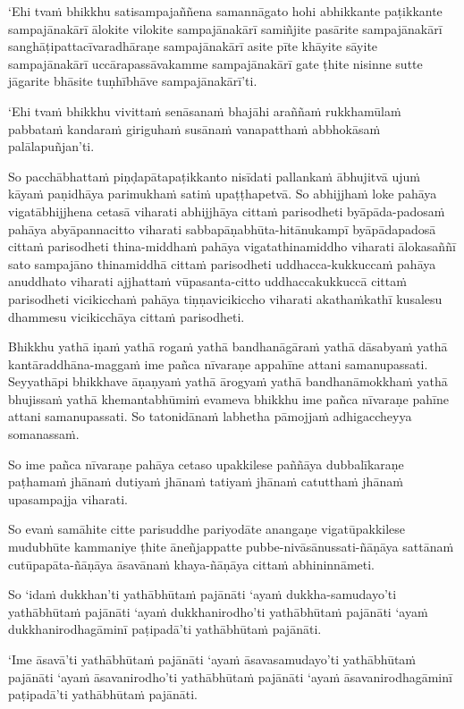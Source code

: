 `Ehi tvaṁ bhikkhu satisampajaññena samannāgato hohi abhikkante paṭikkante sampajānakārī ālokite vilokite sampajānakārī samiñjite pasārite sampajānakārī sanghāṭipattacīvaradhāraṇe sampajānakārī asite pīte khāyite sāyite sampajānakārī uccārapassāvakamme sampajānakārī gate ṭhite nisinne sutte jāgarite bhāsite tuṇhībhāve sampajānakārī'ti.

`Ehi tvaṁ bhikkhu vivittaṁ senāsanaṁ bhajāhi araññaṁ rukkhamūlaṁ pabbataṁ kandaraṁ giriguhaṁ susānaṁ vanapatthaṁ abbhokāsaṁ palālapuñjan'ti.

So pacchābhattaṁ piṇḍapātapaṭikkanto nisīdati pallankaṁ ābhujitvā ujuṁ kāyaṁ paṇidhāya parimukhaṁ satiṁ upaṭṭhapetvā. So abhijjhaṁ loke pahāya vigatābhijjhena cetasā viharati abhijjhāya cittaṁ parisodheti byāpāda-padosaṁ pahāya abyāpannacitto viharati sabbapāṇabhūta-hitānukampī byāpādapadosā cittaṁ parisodheti thina-middhaṁ pahāya vigatathinamiddho viharati ālokasaññī sato sampajāno thinamiddhā cittaṁ parisodheti uddhacca-kukkuccaṁ pahāya anuddhato viharati ajjhattaṁ vūpasanta-citto uddhaccakukkuccā cittaṁ parisodheti vicikicchaṁ pahāya tiṇṇavicikiccho viharati akathaṁkathī kusalesu dhammesu vicikicchāya cittaṁ parisodheti.

\suttaRef{[MN 107]}

Bhikkhu yathā iṇaṁ yathā rogaṁ yathā bandhanāgāraṁ yathā dāsabyaṁ yathā kantāraddhāna-maggaṁ ime pañca nīvaraṇe appahīne attani samanupassati. Seyyathāpi bhikkhave āṇaṇyaṁ yathā ārogyaṁ yathā bandhanāmokkhaṁ yathā bhujissaṁ yathā khemantabhūmiṁ evameva bhikkhu ime pañca nīvaraṇe pahīne attani samanupassati. So tatonidānaṁ labhetha pāmojjaṁ adhigaccheyya somanassaṁ.

So ime pañca nīvaraṇe pahāya cetaso upakkilese paññāya dubbalīkaraṇe paṭhamaṁ jhānaṁ dutiyaṁ jhānaṁ tatiyaṁ jhānaṁ catutthaṁ jhānaṁ upasampajja viharati.

So evaṁ samāhite citte parisuddhe pariyodāte anangaṇe vigatūpakkilese mudubhūte kammaniye ṭhite āneñjappatte pubbe-nivāsānussati-ñāṇāya sattānaṁ cutūpapāta-ñāṇāya āsavānaṁ khaya-ñāṇāya cittaṁ abhininnāmeti.

So `idaṁ dukkhan'ti yathābhūtaṁ pajānāti `ayaṁ dukkha-samudayo'ti yathābhūtaṁ pajānāti `ayaṁ dukkhanirodho'ti yathābhūtaṁ pajānāti `ayaṁ dukkhanirodhagāminī paṭipadā'ti yathābhūtaṁ pajānāti.

`Ime āsavā'ti yathābhūtaṁ pajānāti `ayaṁ āsavasamudayo'ti yathābhūtaṁ pajānāti `ayaṁ āsavanirodho'ti yathābhūtaṁ pajānāti `ayaṁ āsavanirodhagāminī paṭipadā'ti yathābhūtaṁ pajānāti.

